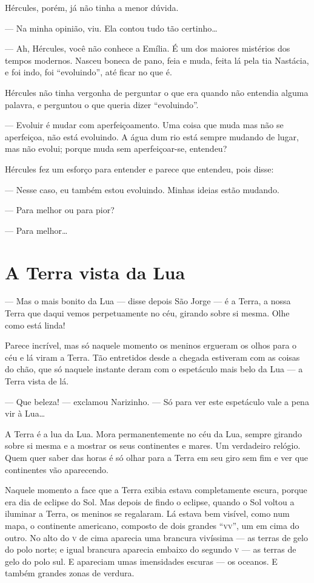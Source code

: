 Hércules, porém, já não tinha a menor dúvida.

--- Na minha opinião, viu. Ela contou tudo tão certinho\ldots{}

--- Ah, Hércules, você não conhece a Emília. É um dos maiores mistérios
dos tempos modernos. Nasceu boneca de pano, feia e muda, feita lá pela
tia Nastácia, e foi indo, foi ``evoluindo'', até ficar no que é.

Hércules não tinha vergonha de perguntar o que era quando não entendia
alguma palavra, e perguntou o que queria dizer ``evoluindo''.

--- Evoluir é mudar com aperfeiçoamento. Uma coisa que muda mas não se
aperfeiçoa, não está evoluindo. A água dum rio está sempre mudando de
lugar, mas não evolui; porque muda sem aperfeiçoar-se, entendeu?

Hércules fez um esforço para entender e parece que entendeu, pois disse:

--- Nesse caso, eu também estou evoluindo. Minhas ideias estão mudando.

--- Para melhor ou para pior?

--- Para melhor\ldots{}


\chapter{A Terra vista da Lua}

--- Mas o mais bonito da Lua --- disse depois São Jorge --- é a Terra, a
nossa Terra que daqui vemos perpetuamente no céu, girando sobre si
mesma. Olhe como está linda!

Parece incrível, mas só naquele momento os meninos ergueram os olhos
para o céu e lá viram a Terra. Tão entretidos desde a chegada estiveram
com as coisas do chão, que só naquele instante deram com o espetáculo
mais belo da Lua --- a Terra vista de lá.

--- Que beleza! --- exclamou Narizinho. --- Só para ver este espetáculo
vale a pena vir à Lua\ldots{}

A Terra é a lua da Lua. Mora permanentemente no céu da Lua, sempre
girando sobre si mesma e a mostrar os seus continentes e mares. Um
verdadeiro relógio. Quem quer saber das horas é só olhar para a Terra em
seu giro sem fim e ver que continentes vão aparecendo.

Naquele momento a face que a Terra exibia estava completamente escura,
porque era dia de eclipse do Sol. Mas depois de findo o eclipse, quando
o Sol voltou a iluminar a Terra, os meninos se regalaram. Lá estava bem
visível, como num mapa, o continente americano, composto de dois grandes
``\textsc{vv}'', um em cima do outro. No alto do \textsc{v} de cima aparecia uma brancura
vivíssima --- as terras de gelo do polo norte; e igual brancura aparecia
embaixo do segundo \textsc{v} --- as terras de gelo do polo sul. E apareciam umas
imensidades escuras --- os oceanos. E também grandes zonas de verdura.

